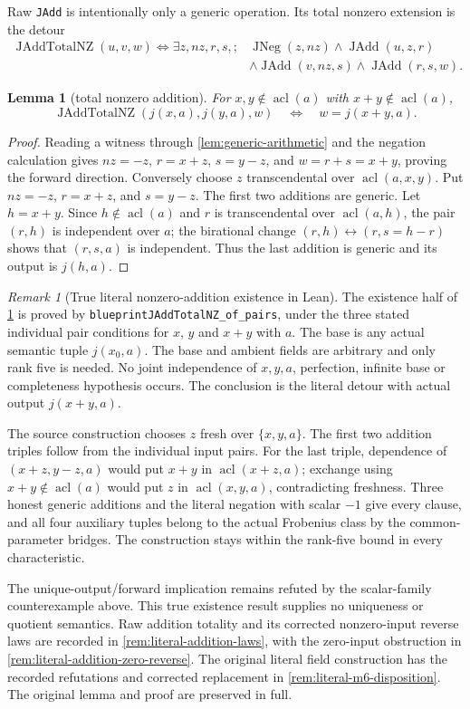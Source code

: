 \documentclass[11pt,oneside]{article}
\newtheorem{lemma}[theorem]{Lemma}
\theoremstyle{definition}
\theoremstyle{remark}
\newtheorem{remark}[theorem]{Remark}
\newcommand{\acl}{\operatorname{acl}}
\newcommand{\lean}[1]{\nolinkurl{#1}}
\begin{document}
Raw \lean{JAdd} is intentionally only a generic operation.  Its total nonzero extension
is the detour
\[
\begin{split}
\operatorname{JAddTotalNZ}(u,v,w)\Longleftrightarrow
\exists z,nz,r,s,;&\operatorname{JNeg}(z,nz)\land
\operatorname{JAdd}(u,z,r)\\
&\land\operatorname{JAdd}(v,nz,s)
\land\operatorname{JAdd}(r,s,w).
\end{split}
\]
\begin{lemma}[total nonzero addition]\label{lem:total-nonzero-add}
For $x,y\notin\acl(a)$ with $x+y\notin\acl(a)$,
\[
 \operatorname{JAddTotalNZ}(j(x,a),j(y,a),w)
 \quad\Longleftrightarrow\quad w=j(x+y,a).
\]
\end{lemma}
\begin{proof}
Reading a witness through \cref{lem:generic-arithmetic} and the negation calculation gives
$nz=-z$, $r=x+z$, $s=y-z$, and $w=r+s=x+y$, proving the forward direction.
Conversely choose $z$ transcendental over $\acl(a,x,y)$.  Put
$nz=-z$, $r=x+z$, and $s=y-z$.  The first two additions are generic.  Let $h=x+y$.
Since $h\notin\acl(a)$ and $r$ is transcendental over $\acl(a,h)$, the pair $(r,h)$ is
independent over $a$; the birational change $(r,h)\leftrightarrow(r,s=h-r)$ shows that
$(r,s,a)$ is independent.  Thus the last addition is generic and its output is
$j(h,a)$.
\end{proof}

\begin{remark}[True literal nonzero-addition existence in Lean]\label{rem:literal-total-nonzero-existence}
The existence half of \cref{lem:total-nonzero-add} is proved by
\lean{blueprintJAddTotalNZ_of_pairs}, under the three stated individual pair conditions
for $x$, $y$ and $x+y$ with $a$. The base is any actual semantic tuple $j(x_0,a)$.
The base and ambient fields are arbitrary and only rank five is needed. No joint
independence of $x,y,a$, perfection, infinite base or completeness hypothesis occurs.
The conclusion is the literal detour with actual output $j(x+y,a)$.

The source construction chooses $z$ fresh over $\{x,y,a\}$. The first two addition
triples follow from the individual input pairs. For the last triple, dependence of
$(x+z,y-z,a)$ would put $x+y$ in $\acl(x+z,a)$; exchange using $x+y\notin\acl(a)$
would put $z$ in $\acl(x,y,a)$, contradicting freshness. Three honest generic additions
and the literal negation with scalar $-1$ give every clause, and all four auxiliary
tuples belong to the actual Frobenius class by the common-parameter bridges.
The construction stays within the rank-five bound in every characteristic.

The unique-output/forward implication remains refuted by the scalar-family
counterexample above. This true existence result supplies no uniqueness or quotient
semantics. Raw addition totality and its corrected nonzero-input reverse laws are
recorded in \cref{rem:literal-addition-laws}, with the zero-input obstruction in
\cref{rem:literal-addition-zero-reverse}. The original literal field construction has
the recorded refutations and corrected replacement in \cref{rem:literal-m6-disposition}.
The original lemma and proof are preserved in full.
\end{remark}
\end{document}
